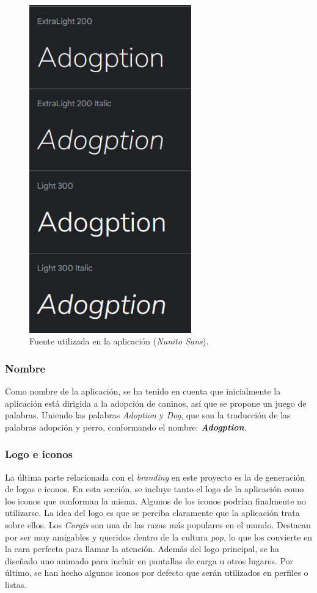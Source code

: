 \documentclass[a4paper, 12pt]{article}
\begin{document}
\begin{figure}[H]
	\begin{center}
		{\includegraphics[width=7cm]{design/NunitoFont.png}\par}
		\caption{Fuente utilizada en la aplicación (\textit{Nunito Sans}).}
	\end{center}
\end{figure}

\subsubsection{Nombre}

Como nombre de la aplicación,  se ha tenido en cuenta que inicialmente la aplicación está dirigida a la adopción de caninos, así que se propone un juego de palabras. Uniendo las palabras \textit{Adoption} y \textit{Dog}, que son la traducción de las palabras adopción y perro, conformando el nombre: \textbf{\textit{Adogption}}.

\subsubsection{Logo e iconos}

La última parte relacionada con el \textit{branding} en este proyecto es la de generación de logos e iconos. En esta sección, se incluye tanto el logo de la aplicación como los iconos que conforman la misma. Algunos de los iconos podrían finalmente no utilizarse. La idea del logo es que se perciba claramente que la aplicación trata sobre ellos. Los \textit{Corgis} son una de las razas más populares en el mundo. Destacan por ser muy amigables y queridos dentro de la cultura \textit{pop}, lo que los convierte en la cara perfecta para llamar la atención. Además del logo principal, se ha diseñado uno animado para incluir en pantallas de carga u otros lugares. Por último, se han hecho algunos iconos por defecto que serán utilizados en perfiles o listas.
\end{document}
